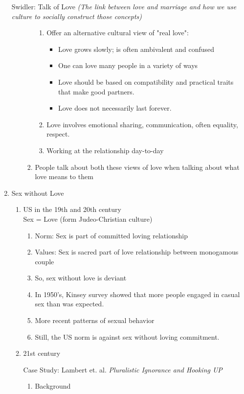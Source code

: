 \documentclass[12pt,a4paper]{article}
\begin{document}
\begin{enumerate}
\begin{eg}{Swidler: Talk of Love \textit{(The link between love and marriage and how we use culture to socially construct those concepts)}}
\begin{enumerate}
\begin{enumerate}
\begin{enumerate}
					\item Offer an alternative cultural view of "real love": 
					\begin{itemize}
						\item Love grows slowly; is often ambivalent and confused
						\item One can love many people in a variety of ways
						\item Love should be based on compatibility and practical traits that make good partners.
						\item Love does not necessarily last forever. 
					\end{itemize}
					\item Love involves emotional sharing, communication, often equality, respect.
					\item Working at the relationship day-to-day
				\end{enumerate}
				\item People talk about both these views of love when talking about what love means to them
			\end{enumerate}
		\end{enumerate}
	\end{eg}
	\item Sex without Love
	\begin{enumerate}
		\item US in the 19th and 20th century \\
		Sex = Love (form Judeo-Christian culture)
		\begin{enumerate}
			\item Norm: Sex is part of committed loving relationship
			\item Values: Sex is sacred part of love relationship between monogamous couple
			\item So, sex without love is deviant
			\item In 1950's, Kinsey survey showed that more people engaged in casual sex than was expected.
			\item More recent patterns of sexual behavior
			\item Still, the US norm is against sex without loving commitment. 
		\end{enumerate}
		\item 21st century
		\begin{eg}{Case Study: Lambert et. al. \textit{Pluralistic Ignorance and Hooking UP}}
			\begin{enumerate}
				\item Background
				\begin{itemize}

\end{itemize}
\end{enumerate}
\end{eg}
\end{enumerate}
\end{enumerate}
\end{document}
